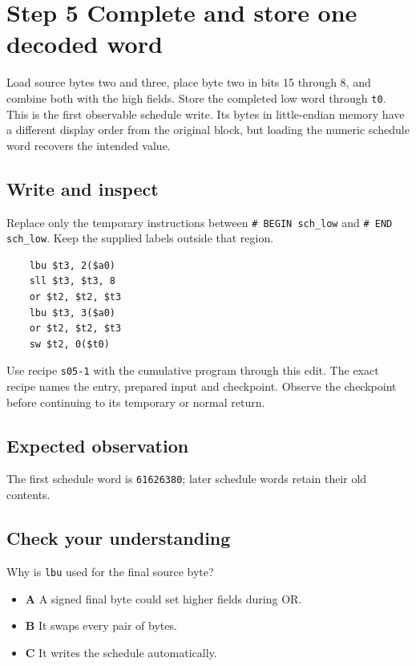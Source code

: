 \section{Step 5 Complete and store one decoded word}\label{sha-s05}

Load source bytes two and three, place byte two in bits 15 through 8, and combine both with the high fields. Store the completed low word through \texttt{t0}. This is the first observable schedule write. Its bytes in little-endian memory have a different display order from the original block, but loading the numeric schedule word recovers the intended value.

\subsection{Write and inspect}
Replace only the temporary instructions between \texttt{\# BEGIN sch\_low} and \texttt{\# END sch\_low}. Keep the supplied labels outside that region.

\begin{verbatim}
    lbu $t3, 2($a0)
    sll $t3, $t3, 8
    or $t2, $t2, $t3
    lbu $t3, 3($a0)
    or $t2, $t2, $t3
    sw $t2, 0($t0)
\end{verbatim}

Use recipe \texttt{s05-1} with the cumulative program through this edit. The exact recipe names the entry, prepared input and checkpoint. Observe the checkpoint before continuing to its temporary or normal return.

\subsection{Expected observation}
The first schedule word is \texttt{61626380}; later schedule words retain their old contents.

\subsection{Check your understanding}
Why is \texttt{lbu} used for the final source byte?

\begin{itemize}
  \item \textbf{A} A signed final byte could set higher fields during OR.
  \item \textbf{B} It swaps every pair of bytes.
  \item \textbf{C} It writes the schedule automatically.
\end{itemize}
